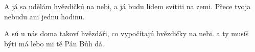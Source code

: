 \beginverse{}
\chordsoff{}
A já sa udělám hvězdičkú na nebi,
a já budu lidem svítiti na zemi.
Přece tvoja nebudu ani jednu hodinu.
\chordson{}
\endverse{}

\beginverse{}
\chordsoff{}
A sú u nás doma takoví hvězdáři,
co vypočítajú hvězdičky na nebi.
a ty musíš býti má lebo mi tě Pán Bůh dá.
\chordson{}
\endverse{}

\endsong{}
